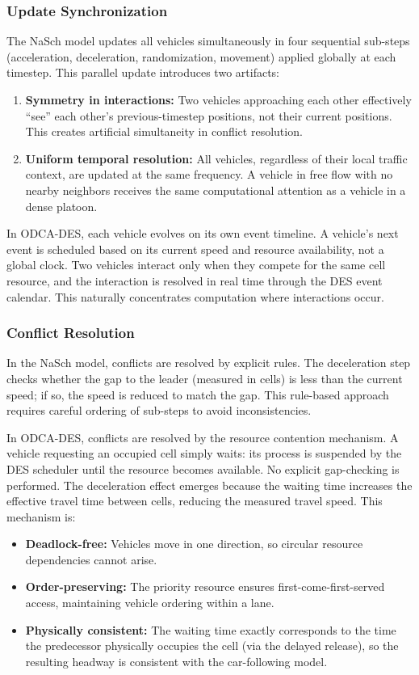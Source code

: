 \documentclass[review,authoryear]{elsarticle}
\begin{document}
\subsubsection{Update Synchronization}

The NaSch model updates all vehicles simultaneously in four sequential sub-steps (acceleration, deceleration, randomization, movement) applied globally at each timestep. This parallel update introduces two artifacts:
\begin{enumerate}
    \item \textbf{Symmetry in interactions:} Two vehicles approaching each other effectively ``see'' each other's previous-timestep positions, not their current positions. This creates artificial simultaneity in conflict resolution.
    \item \textbf{Uniform temporal resolution:} All vehicles, regardless of their local traffic context, are updated at the same frequency. A vehicle in free flow with no nearby neighbors receives the same computational attention as a vehicle in a dense platoon.
\end{enumerate}

In ODCA-DES, each vehicle evolves on its own event timeline. A vehicle's next event is scheduled based on its current speed and resource availability, not a global clock. Two vehicles interact only when they compete for the same cell resource, and the interaction is resolved in real time through the DES event calendar. This naturally concentrates computation where interactions occur.

\subsubsection{Conflict Resolution}

In the NaSch model, conflicts are resolved by explicit rules. The deceleration step checks whether the gap to the leader (measured in cells) is less than the current speed; if so, the speed is reduced to match the gap. This rule-based approach requires careful ordering of sub-steps to avoid inconsistencies.

In ODCA-DES, conflicts are resolved by the resource contention mechanism. A vehicle requesting an occupied cell simply waits: its process is suspended by the DES scheduler until the resource becomes available. No explicit gap-checking is performed. The deceleration effect emerges because the waiting time increases the effective travel time between cells, reducing the measured travel speed. This mechanism is:
\begin{itemize}
    \item \textbf{Deadlock-free:} Vehicles move in one direction, so circular resource dependencies cannot arise.
    \item \textbf{Order-preserving:} The priority resource ensures first-come-first-served access, maintaining vehicle ordering within a lane.
    \item \textbf{Physically consistent:} The waiting time exactly corresponds to the time the predecessor physically occupies the cell (via the delayed release), so the resulting headway is consistent with the car-following model.
\end{itemize}
\end{document}
